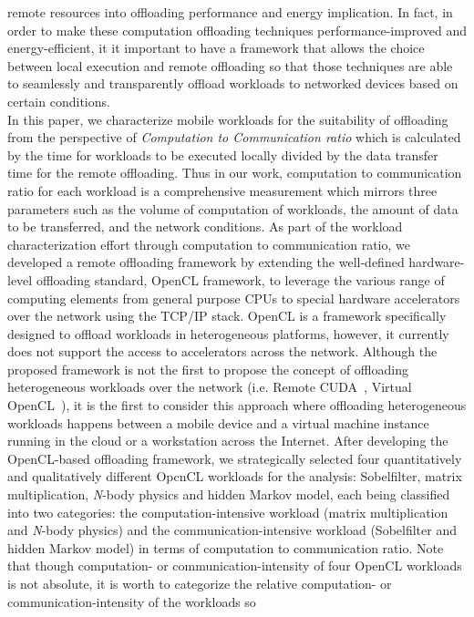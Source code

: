 \documentclass[conference]{IEEEtran}
\begin{document}
remote resources into offloading performance and energy implication.
%
In fact, in order to make these computation offloading techniques
performance-improved and energy-efficient, it it important to have a
framework that allows the choice between local execution and
remote offloading so that those techniques are able to seamlessly and
transparently offload workloads to networked devices based on certain
conditions.\\
%
\indent In this paper, we characterize mobile workloads for the
suitability of offloading from the perspective of \textit {Computation to
Communication ratio} which is calculated by the time for workloads to be
executed locally divided by the data transfer time for the remote
offloading.
%
Thus in our work, computation to communication ratio for each workload is
a comprehensive measurement which mirrors three parameters such as the
volume of computation of workloads, the amount of data to be transferred, and the
network conditions. 
%
As part of the workload characterization effort through computation to
communication ratio, we developed a remote
offloading framework by extending the well-defined hardware-level
offloading standard, OpenCL framework, to leverage the various range of
computing elements from general purpose CPUs to special
hardware accelerators over the network using the TCP/IP stack.
%
OpenCL is a framework specifically designed to offload workloads in
heterogeneous platforms, however, it currently does not support the
access to accelerators across the network.
%
Although the proposed framework is not the first to propose the concept
of offloading heterogeneous workloads over the network (i.e. Remote
CUDA~\cite{rcuda}, Virtual OpenCL~\cite{vocl}), it is the first to consider
this approach where offloading heterogeneous workloads happens between
a mobile device and a virtual machine instance running in the cloud or a
workstation across the Internet.
%
After developing the OpenCL-based offloading framework, 
we strategically selected four quantitatively and qualitatively 
different OpcnCL workloads for the analysis:
Sobelfilter, matrix multiplication, \textit{N}-body physics and hidden
Markov model, each being classified into two categories: 
the computation-intensive workload (matrix multiplication and 
\textit{N}-body physics) and the communication-intensive workload 
(Sobelfilter and hidden Markov model) in terms of computation to communication ratio.
%
Note that though computation- or communication-intensity of
four OpenCL workloads is not absolute, it is worth to categorize 
the relative computation- or communication-intensity of the workloads so
\end{document}
